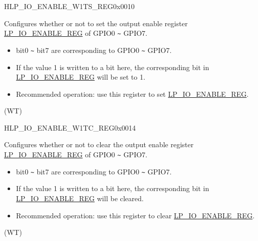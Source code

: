 \begin{register}{H}{LP\_IO\_ENABLE\_W1TS\_REG}{0x0010}\label{regdesc:LPIOENABLEW1TSREG}
%
%
\regnewline%
\begin{regdesc}\begin{reglist}
\label{fielddesc:LPGPIOENABLEW1TS}\item [LP\_GPIO\_ENABLE\_W1TS] Configures whether or not to set the output enable register \hyperref[regdesc:LPIOENABLEREG]{LP\_IO\_ENABLE\_REG} of GPIO0 \verb+~+ GPIO7.\\
\begin{itemize}
    \item bit0 \verb+~+ bit7 are corresponding to GPIO0 \verb+~+ GPIO7.
    \item If the value 1 is written to a bit here, the corresponding bit in \hyperref[regdesc:LPIOENABLEREG]{LP\_IO\_ENABLE\_REG} will be set to 1.
    \item Recommended operation: use this register to set \hyperref[regdesc:LPIOENABLEREG]{LP\_IO\_ENABLE\_REG}. \end{itemize} (WT)
\end{reglist}\end{regdesc}
\end{register}


\begin{register}{H}{LP\_IO\_ENABLE\_W1TC\_REG}{0x0014}\label{regdesc:LPIOENABLEW1TCREG}
%
%
\regnewline%
\begin{regdesc}\begin{reglist}
\label{fielddesc:LPGPIOENABLEW1TC}\item [LP\_GPIO\_ENABLE\_W1TC] Configures whether or not to clear the output enable register \hyperref[regdesc:LPIOENABLEREG]{LP\_IO\_ENABLE\_REG} of GPIO0 \verb+~+ GPIO7.\\
\begin{itemize}
    \item bit0 \verb+~+ bit7 are corresponding to GPIO0 \verb+~+ GPIO7.
    \item If the value 1 is written to a bit here, the corresponding bit in \hyperref[regdesc:LPIOENABLEREG]{LP\_IO\_ENABLE\_REG} will be cleared.
    \item Recommended operation: use this register to clear \hyperref[regdesc:LPIOENABLEREG]{LP\_IO\_ENABLE\_REG}. \end{itemize} (WT)
\end{reglist}\end{regdesc}
\end{register}



